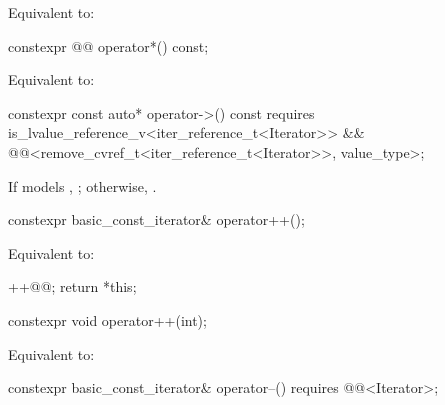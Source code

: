 \begin{itemdescr}
\pnum
\effects
Equivalent to: 
\end{itemdescr}

%
\begin{itemdecl}
constexpr @@ operator*() const;
\end{itemdecl}

\begin{itemdescr}
\pnum
\effects
Equivalent to: 
\end{itemdescr}

%
\begin{itemdecl}
constexpr const auto* operator->() const
  requires is_lvalue_reference_v<iter_reference_t<Iterator>> &&
           @@<remove_cvref_t<iter_reference_t<Iterator>>, value_type>;
\end{itemdecl}

\begin{itemdescr}
\pnum
\returns
If  models ,
;
otherwise, .
\end{itemdescr}

%
\begin{itemdecl}
constexpr basic_const_iterator& operator++();
\end{itemdecl}

\begin{itemdescr}
\pnum
\effects
Equivalent to:
\begin{codeblock}
++@@;
return *this;
\end{codeblock}
\end{itemdescr}

%
\begin{itemdecl}
constexpr void operator++(int);
\end{itemdecl}

\begin{itemdescr}
\pnum
\effects
Equivalent to: 
\end{itemdescr}

%
\begin{itemdecl}
constexpr basic_const_iterator& operator--() requires @@<Iterator>;
\end{itemdecl}

